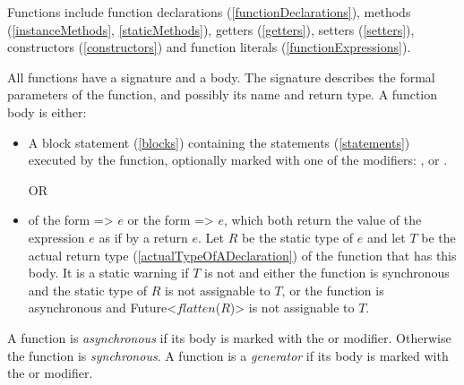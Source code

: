 \documentclass{article}
\newcommand{\code}[1]{{\sf #1}}
\begin{document}
\LMHash{}
Functions include  function declarations (\ref{functionDeclarations}), methods (\ref{instanceMethods},  \ref{staticMethods}), getters  (\ref{getters}), setters  (\ref{setters}), constructors  (\ref{constructors}) and function literals  (\ref{functionExpressions}).

\LMHash{}
All functions have a signature and a body. The signature describes the formal parameters of the function, and possibly its name and return type.  A function body is either:
\begin{itemize}
\item A block statement (\ref{blocks}) containing the statements (\ref{statements}) executed by the function, optionally marked with one of the modifiers: \ASYNC, \ASYNC* or \SYNC*.


OR
\item of the form \code{=> $e$} or the form \code{\ASYNC{} => $e$}, which both return the value of the expression $e$ as if by a \code{return $e$}. 
Let $R$ be the static type of $e$
and let $T$ be the actual return type (\ref{actualTypeOfADeclaration})
of the function that has this body.
It is a static warning if $T$ is not \VOID{} and either
the function is synchronous and the static type of $R$ is not assignable to $T$,
or the function is asynchronous and \code{Future<$flatten$($R$)>}
is not assignable to $T$.

\end{itemize}

\LMHash{}
A function is {\em asynchronous} if its body is marked with the \ASYNC{} or \ASYNC* modifier. Otherwise the function is {\em synchronous}. A function is a {\em generator} if its body is marked with the \SYNC* or \ASYNC* modifier.

\end{document}
